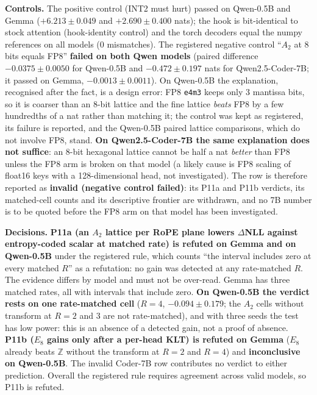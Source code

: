 \documentclass[11pt,a4paper]{article}
\begin{document}
\textbf{Controls.} The positive control (INT2 must hurt) passed on Qwen-0.5B and Gemma ($+6.213 \pm 0.049$ and $+2.690 \pm 0.400$ nats); the hook is bit-identical to stock attention (hook-identity control) and the torch decoders equal the numpy references on all models (0 mismatches). The registered negative control ``$A_2$ at 8 bits equals FP8'' \textbf{failed on both Qwen models} (paired difference $-0.0375 \pm 0.0050$ for Qwen-0.5B and $-0.472 \pm 0.197$ nats for Qwen2.5-Coder-7B; it passed on Gemma, $-0.0013 \pm 0.0011$). On Qwen-0.5B the explanation, recognised after the fact, is a design error: FP8 \texttt{e4m3} keeps only 3 mantissa bits, so it is coarser than an 8-bit lattice and the fine lattice \emph{beats} FP8 by a few hundredths of a nat rather than matching it; the control was kept as registered, its failure is reported, and the Qwen-0.5B paired lattice comparisons, which do not involve FP8, stand. \textbf{On Qwen2.5-Coder-7B the same explanation does not suffice}: an 8-bit hexagonal lattice cannot be half a nat \emph{better} than FP8 unless the FP8 arm is broken on that model (a likely cause is FP8 scaling of float16 keys with a 128-dimensional head, not investigated). The row is therefore reported as \textbf{invalid (negative control failed)}: its P11a and P11b verdicts, its matched-cell counts and its descriptive frontier are withdrawn, and no 7B number is to be quoted before the FP8 arm on that model has been investigated.

\textbf{Decisions.} \textbf{P11a (an $A_2$ lattice per RoPE plane lowers $\Delta$NLL against entropy-coded scalar at matched rate) is refuted on Gemma and on Qwen-0.5B} under the registered rule, which counts ``the interval includes zero at every matched $R$'' as a refutation: no gain was detected at any rate-matched $R$. The evidence differs by model and must not be over-read. Gemma has three matched rates, all with intervals that include zero. \textbf{On Qwen-0.5B the verdict rests on one rate-matched cell} ($R=4$, $-0.094 \pm 0.179$; the $A_2$ cells without transform at $R=2$ and $3$ are not rate-matched), and with three seeds the test has low power: this is an absence of a detected gain, not a proof of absence. \textbf{P11b ($E_8$ gains only after a per-head KLT) is refuted on Gemma} ($E_8$ already beats $\mathbb{Z}$ without the transform at $R=2$ and $R=4$) and \textbf{inconclusive on Qwen-0.5B}. The invalid Coder-7B row contributes no verdict to either prediction. Overall the registered rule requires agreement across valid models, so P11b is refuted.
\end{document}
